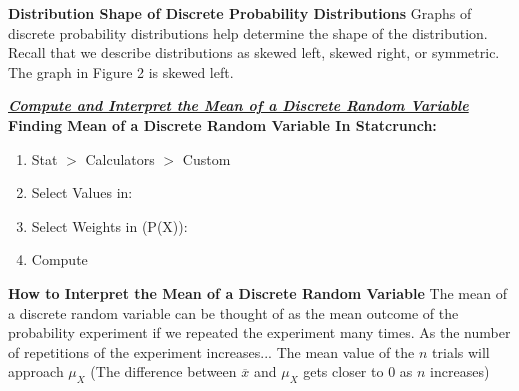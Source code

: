\documentclass{report}
\begin{document}
    \pagebreak \bigbreak \noindent 
    \textbf{Distribution Shape of Discrete Probability Distributions}
    \bigbreak \noindent 
    Graphs of discrete probability distributions help determine the shape of the distribution.
    \bigbreak \noindent 
    Recall that we describe distributions as skewed left, skewed right, or symmetric. The graph in Figure 2 is skewed left.

    \bigbreak \noindent \bigbreak \noindent 
    \textbf{\textit{\underline{Compute and Interpret the Mean of a Discrete Random Variable}}}
    \bigbreak \noindent 
    \textbf{Finding Mean of a Discrete Random Variable In Statcrunch:}
    \begin{enumerate}
        \item Stat $> $ Calculators $> $ Custom
        \item Select Values in:
        \item Select Weights in (P(X)):
        \item Compute
    \end{enumerate}
    \bigbreak \noindent \bigbreak \noindent 
    \textbf{How to Interpret the Mean of a Discrete Random Variable}
    \bigbreak \noindent 
    The mean of a discrete random variable can be thought of as the mean outcome of the probability experiment if we repeated the experiment many times. 
    \bigbreak \noindent 
    As the number of repetitions of the experiment increases... The mean value of the $n $ trials will approach $\mu_{X}$ (The difference between $\overline{x} $ and $\mu_{X} $ gets closer to 0 as $n$ increases)
\end{document}
